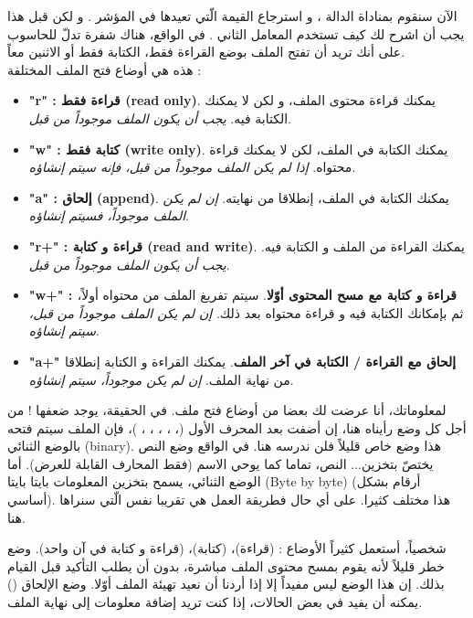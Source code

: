 الآن سنقوم بمناداة الدالة
،
و استرجاع القيمة الّتي تعيدها في المؤشر
.
و لكن قبل هذا يجب أن اشرح لك كيف تستخدم المعامل الثاني
.
في الواقع، هناك شفرة تدلّ للحاسوب على أنك تريد أن تفتح الملف بوضع القراءة فقط، الكتابة فقط أو الاثنين معاً.\\
هذه هي أوضاع فتح الملف المختلفة :
\begin{itemize}
  \item \textbf{\textenglish{"r"} :
قراءة فقط
(\textenglish{read only})}.
يمكنك قراءة محتوى الملف، و لكن لا يمكنك الكتابة فيه.
\textit{يجب أن يكون الملف موجوداً من قبل}.
  \item \textbf{\textenglish{"w"} :
كتابة فقط
(\textenglish{write only})}.
يمكنك الكتابة في الملف، لكن لا يمكنك قراءة محتواه.
\textit{إذا لم يكن الملف موجوداً من قبل، فإنه سيتم إنشاؤه}.
  \item \textbf{\textenglish{"a"} :
إلحاق
(\textenglish{append})}.
يمكنك الكتابة في الملف، إنطلاقا من نهايته.
\textit{إن لم يكن الملف موجوداً، فسيتم إنشاؤه}.
  \item \textbf{\textenglish{"r+"} :
قراءة و كتابة
(\textenglish{read and write})}.
يمكنك القراءة من الملف و الكتابة فيه.
\textit{يجب أن يكون الملف موجوداً من قبل}.
  \item \textbf{\textenglish{"w+"} :
قراءة و كتابة مع مسح المحتوى أوّلا}.
سيتم تفريغ الملف من محتواه أولاً، ثم بإمكانك الكتابة فيه و قراءة محتواه بعد ذلك.
\textit{إن لم يكن الملف موجوداً من قبل، سيتم إنشاؤه}.
  \item \textbf{\textenglish{"a+"}
إلحاق مع القراءة / الكتابة في آخر الملف}.
يمكنك القراءة و الكتابة إنطلاقا من نهاية الملف.
\textit{إن لم يكن موجوداً، سيتم إنشاؤه}.
\end{itemize}

لمعلوماتك، أنا عرضت لك بعضا من أوضاع فتح ملف. في الحقيقة، يوجد ضعفها !
من أجل كل وضع رأيناه هنا، إن أضفت
بعد المحرف الأول
(، ، ، ، ، )،
فإن الملف سيتم فتحه بالوضع الثنائي
(\textenglish{binary}).
هذا وضع خاص قليلاً فلن ندرسه هنا. في الواقع وضع النص يختصّ بتخزين... النص، تماما كما يوحي الاسم (فقط المحارف القابلة للعرض). أما الوضع الثنائي، يسمح بتخزين المعلومات
بايتا بايتا
(\textenglish{Byte by byte})
(أرقام بشكل أساسي). هذا مختلف كثيرا. على أي حال فطريقة العمل هي تقريبا نفس الّتي سنراها هنا.

شخصياً، أستعمل كثيراً الأوضاع :
(قراءة)،
(كتابة)،
(قراءة و كتابة في آن واحد). وضع
خطر قليلاً لأنه يقوم بمسح محتوى الملف مباشرة، بدون أن يطلب التأكيد قبل القيام بذلك. إن هذا الوضع ليس مفيداً إلا إذا أردنا أن نعيد تهيئة الملف أوّلا.
وضع الإلحاق
()
يمكنه أن يفيد في بعض الحالات، إذا كنت تريد إضافة معلومات إلى نهاية الملف.

